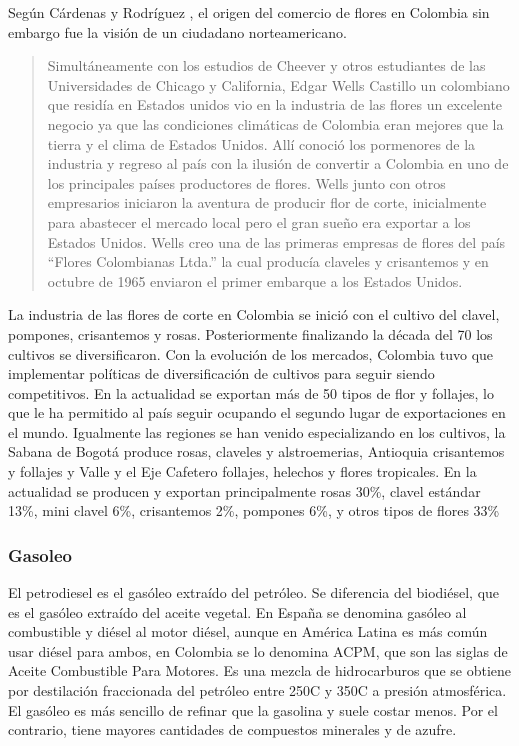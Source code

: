 \begin{spacing}{1.5}
Según Cárdenas y Rodríguez \cite{cardenasRodriguez}, el origen del comercio de flores en Colombia sin embargo fue la visión de un ciudadano norteamericano. 

\begin{quote}
Simultáneamente con los estudios de Cheever y otros estudiantes de las Universidades de Chicago y California, Edgar Wells Castillo un colombiano que residía en Estados unidos vio en la industria de las flores un excelente negocio ya que las condiciones climáticas de Colombia eran mejores que la tierra  y  el  clima de Estados Unidos. Allí conoció los pormenores de la industria y regreso al país con la ilusión de convertir a Colombia en uno de los principales países productores de flores. Wells junto con otros empresarios iniciaron la aventura de producir flor de corte, inicialmente para abastecer el mercado local pero el gran sueño era exportar a los Estados Unidos. Wells creo una de las primeras empresas de flores del país “Flores  Colombianas  Ltda.” la cual producía claveles y crisantemos y en octubre de 1965 enviaron el primer embarque a los Estados Unidos.
\end{quote}

La industria de las flores de corte en Colombia se inició con el cultivo del clavel, pompones, crisantemos y rosas. Posteriormente finalizando la década del  70 los cultivos se diversificaron. Con la evolución de los mercados, Colombia  tuvo que implementar políticas de diversificación de cultivos para seguir siendo  competitivos.  En  la  actualidad  se  exportan  más  de  50  tipos  de  flor  y  follajes,  lo  que  le  ha  permitido  al  país  seguir  ocupando el segundo lugar de exportaciones en el mundo. Igualmente  las  regiones  se  han  venido  especializando  en  los  cultivos, la Sabana de Bogotá produce rosas, claveles y alstroemerias, Antioquia crisantemos y follajes y Valle y el Eje Cafetero  follajes, helechos y flores tropicales. En la actualidad se producen y  exportan  principalmente rosas 30\%, clavel estándar 13\%, mini clavel 6\%, crisantemos 2\%, pompones 6\%, y otros tipos de flores 33\% \cite{cardenasRodriguez}

\subsubsection{Gasoleo}
El petrodiesel es el gasóleo extraído del petróleo. Se diferencia del biodiésel, que es el gasóleo extraído del aceite vegetal. En España se denomina gasóleo al combustible y diésel al motor diésel, aunque en América Latina es más común usar diésel para ambos, en Colombia se lo denomina ACPM, que son las siglas de Aceite Combustible Para Motores. Es una mezcla de hidrocarburos que se obtiene por destilación fraccionada del petróleo entre 250C y 350C a presión atmosférica. El gasóleo es más sencillo de refinar que la gasolina y suele costar menos. Por el contrario, tiene mayores cantidades de compuestos minerales y de azufre.


\end{spacing}
